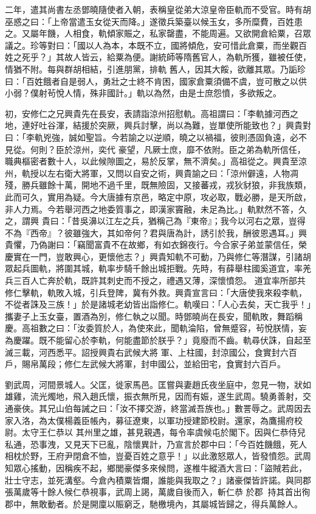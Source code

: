 \begin{pinyinscope}
 二年，遣其尚書左丞鄧曉隨使者入朝，表稱皇從弟大涼皇帝臣軌而不受官。時有胡巫惑之曰：「上帝當遣玉女從天而降。」遂徵兵築臺以候玉女，多所糜費，百姓患之。又屬年饑，人相食，軌傾家賑之，私家罄盡，不能周遍。又欲開倉給粟，召眾議之。珍等對曰：「國以人為本，本既不立，國將傾危，安可惜此倉粟，而坐觀百姓之死乎？」其故人皆云，給粟為便。謝統師等隋舊官人，為軌所獲，雖被任使，情猶不附。每與群胡相結，引進朋黨，排軌
 舊人，因其大餒，欲離其眾。乃詬珍曰：「百姓餓者自是弱人，勇壯之士終不肯困，國家倉粟須備不虞，豈可散之以供小弱？僕射茍悅人情，殊非國計。」軌以為然，由是士庶怨憤，多欲叛之。



 初，安修仁之兄興貴先在長安，表請詣涼州招慰軌。高祖謂曰：「李軌據河西之地，連好吐谷渾，結援於突厥，興兵討擊，尚以為難，豈單使所能致也？」興貴對曰：「李軌兇強，誠如聖旨。今若諭之以逆順，曉之以禍福，彼則憑固負遠，必不見從。何則？臣於涼州，奕代
 豪望，凡厥士庶，靡不依附。臣之弟為軌所信任，職典樞密者數十人，以此候隙圖之，易於反掌，無不濟矣。」高祖從之。興貴至涼州，軌授以左右衛大將軍，又問以自安之術，興貴諭之曰：「涼州僻遠，人物凋殘，勝兵雖餘十萬，開地不過千里，既無險固，又接蕃戎，戎狄豺狼，非我族類，此而可久，實用為疑。今大唐據有京邑，略定中原，攻必取，戰必勝，是天所啟，非人力焉。今若舉河西之地委質事之，即漢家竇融，未足為比。」軌默然不答，久之，謂興
 貴曰：「昔吳濞以江左之兵，猶稱己為『東帝』；我今以河右之眾，豈得不為『西帝』？彼雖強大，其如帝何？君與唐為計，誘引於我，酬彼恩遇耳。」興貴懼，乃偽謝曰：「竊聞富貴不在故鄉，有如衣錦夜行。今合家子弟並蒙信任，榮慶實在一門，豈敢興心，更懷他志？」興貴知軌不可動，乃與修仁等潛謀，引諸胡眾起兵圖軌，將圍其城，軌率步騎千餘出城拒戰。先時，有薛舉柱國奚道宜，率羌兵三百人亡奔於軌，既許其刺史而不授之，禮遇又薄，深懷憤怨。
 道宜率所部共修仁擊軌，軌敗入城，引兵登陴，冀有外救。興貴宣言曰：「大唐使我來殺李軌，不從者誅及三族！」於是諸城老幼皆出詣修仁。軌嘆曰：「人心去矣，天亡我乎！」攜妻子上玉女臺，置酒為別，修仁執之以聞。時鄧曉尚在長安，聞軌敗，舞蹈稱慶。高祖數之曰：「汝委質於人，為使來此，聞軌淪陷，曾無蹙容，茍悅朕情，妄為慶躍。既不能留心於李軌，何能盡節於朕乎？」竟廢而不齒。軌尋伏誅，自起至滅三載，河西悉平。詔授興貴右武候大將
 軍、上柱國，封涼國公，食實封六百戶，賜帛萬段；修仁左武候大將軍，封申國公，並給田宅，食實封六百戶。



 劉武周，河間景城人。父匡，徙家馬邑。匡嘗與妻趙氏夜坐庭中，忽見一物，狀如雄雞，流光燭地，飛入趙氏懷，振衣無所見，因而有娠，遂生武周。驍勇善射，交通豪俠。其兄山伯每誡之曰：「汝不擇交游，終當滅吾族也。」數詈辱之。武周因去家入洛，為太僕楊義臣帳內，募征遼東，以軍功授建節校尉。還家，為鷹揚府校尉。太守王仁恭以
 其州里之雄，甚見親遇，每令率虞候屯於閣下。因與仁恭侍兒私通，恐事洩，又見天下已亂，陰懷異計，乃宣言於郡中曰：「今百姓饑餓，死人相枕於野，王府尹閉倉不恤，豈憂百姓之意乎！」以此激怒眾人，皆發憤怨。武周知眾心搖動，因稱疾不起，鄉閭豪傑多來候問，遂椎牛縱酒大言曰：「盜賊若此，壯士守志，並死溝壑。今倉內積粟皆爛，誰能與我取之？」諸豪傑皆許諾。與同郡張萬歲等十餘人候仁恭視事，武周上謁，萬歲自後而入，斬仁恭
 於郡，持其首出徇郡中，無敢動者。於是開廩以賑窮乏，馳檄境內，其屬城皆歸之，得兵萬餘人。




\end{pinyinscope}
